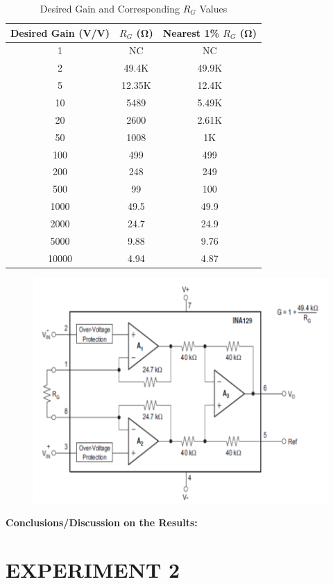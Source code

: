 \documentclass[9pt]{scrreprt}
\begin{document}
\begin{table}[ht]
\centering
\begin{tabular}{|c|c|c|}
\hline
\textbf{Desired Gain (V/V)} & \textbf{$R_G$ (\si{\ohm})} & \textbf{Nearest 1\% $R_G$ (\si{\ohm})} \\ \hline
1     & NC     & NC \\ \hline
2     & 49.4K  & 49.9K \\ \hline
5     & 12.35K & 12.4K \\ \hline
10    & 5489   & 5.49K \\ \hline
20    & 2600   & 2.61K \\ \hline
50    & 1008   & 1K    \\ \hline
100   & 499    & 499   \\ \hline
200   & 248    & 249   \\ \hline
500   & 99     & 100   \\ \hline
1000  & 49.5   & 49.9  \\ \hline
2000  & 24.7   & 24.9  \\ \hline
5000  & 9.88   & 9.76  \\ \hline
10000 & 4.94   & 4.87  \\ \hline
\end{tabular}
\caption{Desired Gain and Corresponding $R_G$ Values}
\label{table:rg_values}
\end{table}

\begin{figure}[H]
	\centering
	\includegraphics[width=0.5\linewidth]{logos/OP-Amp_gain_circuit.PNG}
	\label{fig:op-amp_gain}
\end{figure}

\textbf{Conclusions/Discussion on the Results:}


\newpage

\chapter*{\Large EXPERIMENT 2}
\setcounter{chapter}{2}
\setcounter{table}{0}
\setcounter{figure}{0}
\end{document}
